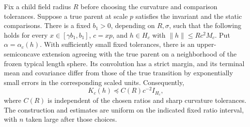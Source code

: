 \begin{lemma}
\label{cap:frozen-evaluation-support}
Fix a child field radius \(R\) before choosing the curvature and
comparison tolerances. Suppose a true parent at scale \(p\) satisfies
the invariant and the static comparisons. There is a fixed \(b_1>0\),
depending on \(R,\sigma\), such that the following holds for every
\(x\in[\gamma b_1,b_1]\), \(c=xp\), and
\(h\in H_c\) with \(\|h\|\le R c^2M_c\). Put
\(\alpha=\alpha_c(h)\). With sufficiently small fixed tolerances, there
is an upper-semiconcave extension agreeing with the true parent on a
neighborhood of the frozen typical length sphere. Its convolution has a
strict margin, and its terminal mean and covariance differ from those of
the true transition by exponentially small errors in the corresponding
scaled units. Consequently,
\begin{equation}\label{cap:ball-evaluation-bound}
 K_c(h)\preceq C(R)c^{-2}I_{H_c},
\end{equation}
where \(C(R)\) is independent of the chosen ratios and sharp curvature
tolerances. The construction and estimates are uniform on the indicated
fixed ratio interval, with \(n\) taken large after those choices.
\end{lemma}
